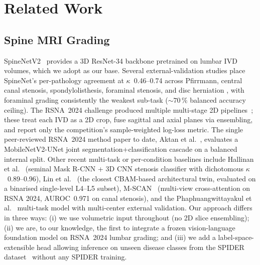 \section{Related Work}
\label{sec:related}

\subsection{Spine MRI Grading}
SpineNetV2~\cite{windsor2024spinenet} provides a 3D ResNet-34 backbone
pretrained on lumbar IVD volumes, which we adopt as our base. Several
external-validation studies place SpineNet's per-pathology agreement at
$\kappa$~0.46--0.74 across Pfirrmann, central canal stenosis,
spondylolisthesis, foraminal stenosis, and disc herniation
\cite{nigru2024spinenetv2,mcsweeney2023spinenet,liu2025spinenetv2ext},
with foraminal grading consistently the weakest sub-task ($\sim70\,\%$
balanced accuracy ceiling). The RSNA~2024 challenge produced multiple
multi-stage 2D pipelines~\cite{nshen7rsna2024,kaggle2nd2024,kaggle4th2024};
these treat each IVD as a 2D crop, fuse sagittal and axial planes via
ensembling, and report only the competition's sample-weighted log-loss
metric. The single peer-reviewed RSNA~2024 method paper to date,
Aktan et al.~\cite{liu2025rsna}, evaluates a MobileNetV2-UNet
joint segmentation+classification cascade on a balanced internal split.
Other recent multi-task or per-condition baselines include
Hallinan et al.~\cite{hallinan2021stenosis} (seminal Mask R-CNN + 3D CNN
stenosis classifier with dichotomous $\kappa$~0.89--0.96),
Lin et al.~\cite{lin2024multiattention} (the closest CBAM-based
architectural twin, evaluated on a binarised single-level L4--L5 subset),
M-SCAN~\cite{hong2025mscan} (multi-view cross-attention on RSNA 2024,
AUROC~0.971 on canal stenosis), and the
Phaphuangwittayakul et al.~\cite{phaphuangwittayakul2026multitask}
multi-task model with multi-center external validation. Our approach
differs in three ways: (i) we use volumetric input throughout (no 2D
slice ensembling); (ii) we are, to our knowledge, the first to integrate
a frozen vision-language foundation model on RSNA~2024 lumbar grading;
and (iii) we add a label-space-extensible head allowing inference on
unseen disease classes from the SPIDER dataset~\cite{vandergraaf2024spider,spider}
without any SPIDER training.

